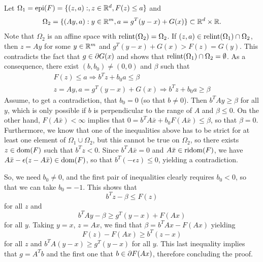 Let $\Omega_1 = \mathrm{epi}(F) = \{(z,a): , z\in {\mathbb{R}}^d, F(z) \leq a\}$ and
\[
\Omega_2 = \{(Ay, a): y\in {\mathbb{R}}^m, a = g^T(y-x) + G(x)\}\subset {\mathbb{R}}^d \times {\mathbb{R}}.
\]
Note that $\Omega_2$ is an affine space with $\mathrm{relint}(\Omega_2) = \Omega_2$.
If $(z, a) \in \mathrm{relint}(\Omega_1)\cap \Omega_2$, then $z = Ay$ for some $y\in {\mathbb{R}}^m$ and $g^T(y-x) + G(x) > F(z) = G(y)$. This contradicts the fact that $g\in \partial G(x)$ and shows that  $\mathrm{relint}(\Omega_1) \cap \Omega_2 = \emptyset$. As a consequence, there exist $(b,b_0)\neq (0,0)$ and $\beta$ such that 
\begin{align*}
F(z) \leq a \Rightarrow b^T z + b_0 a\leq \beta\\
z=Ay, a = g^T(y-x) + G(x) \Rightarrow b^T z + b_0 a\geq \beta
\end{align*}
Assume, to get a contradiction, that $b_0 = 0$ (so that $b\neq 0$). Then $b^T Ay \geq \beta$ for all $y$, which is only possible if $b$ is perpendicular to the range of $A$ and $\beta\leq 0$. On the other hand, $F(A\bar x) <\infty$ implies that $0 = b^T A\bar x + b_0 F(A\bar x) \leq \beta$, so that $\beta = 0$. Furthermore, we know that one of the inequalities above has to be strict for at least one element of $\Omega_1\cup\Omega_2$, but this cannot be true on $\Omega_2$, so there exists $z\in \mathrm{dom}(F)$ such that $b^T z < 0$. Since $b^TA\bar x = 0$ and $A\bar x\in \mathrm{ridom}(F)$, we have $A\bar x - \epsilon(z - A\bar x) \in \mathrm{dom}(F)$, so that $b^T(-\epsilon z) \leq 0$, yielding a contradiction.

So, we need $b_0\neq 0$, and the first pair of inequalities clearly requires $b_0<0$, so that we can take $b_0 = -1$. This shows that 
\[
b^Tz - \beta \leq F(z)
\]
for all $z$ and
\[
b^T Ay - \beta \geq g^T(y-x) + F(Ax)
\]
for all $y$. Taking $y=x$, $z=Ax$, we find that $\beta = b^TAx - F(Ax)$ yielding
\[
F(z) - F(Ax) \geq b^T(z-x) 
\]
for all $z$ and $b^TA (y - x) \geq g^T (y-x)$ for all $y$. This last inequality implies that $g = A^Tb$ and the first one that $b\in \partial F(Ax)$, therefore concluding the proof. 
